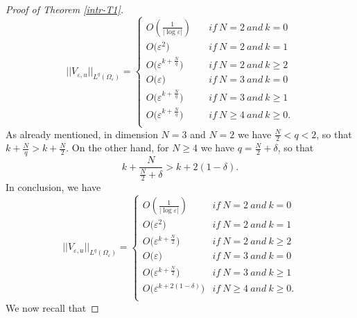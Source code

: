 \documentclass[11pt,reqno]{article}
\numberwithin{equation}{section}
\newcommand\e\varepsilon
\newcommand\la\lambda
\begin{document}
\begin{proof}[Proof of Theorem \ref{intr-T1}]
\begin{equation}
        ||V_{\e,u}||_{L^q(\Omega_\e)}=
            \begin{cases}
                O\left(\frac{1}{|\log\e|}\right)\quad& if  \ N=2  \ and\ k=0\\
                O\big(\e^2\big) & if  \ N=2  \ and\ k=1\\
                O\big(\e^{k+\frac{N}{q}}\big) & if  \ N=2  \ and\ k\ge 2\\
                O\big(\e\big) & if  \ N=3  \ and\ k=0\\
                O\big(\e^{k+\frac{N}{q}}\big) & if  \ N=3  \ and\ k\ge 1\\
                 O\big(\e^{k+\frac{N}{q}}\big) & if  \ N\ge 4  \ and\ k\ge 0.\\
            \end{cases}
        \end{equation}
        As already mentioned, in dimension $N=3$ and $N=2$ we have $\frac{N}{2}<q<2$, so that $k+\frac{N}{q}>k+\frac{N}{2}$. On the other hand, for $N\ge 4$ we have $q=\frac{N}{2}+\delta$, so that 
		\[
		k+\frac{N}{\frac N2+\delta} >k+ 2(1-\delta).
		\]
		In conclusion, we have \begin{equation}
        ||V_{\e,u}||_{L^q(\Omega_\e)}=
            \begin{cases}
                O\left(\frac{1}{|\log\e|}\right)\quad& if  \ N=2  \ and\ k=0\\
                O\big(\e^2\big) & if  \ N=2  \ and\ k=1\\
                O\big(\e^{k+\frac{N}{2}}\big) & if  \ N=2  \ and\ k\ge 2\\
                O\big(\e\big) & if  \ N=3  \ and\ k=0\\
                O\big(\e^{k+\frac{N}{2}}\big) & if  \ N=3  \ and\ k\ge 1\\
                 O\big(\e^{k+ 2(1-\delta)}\big) & if  \ N\ge 4  \ and\ k\ge 0.\\
            \end{cases}
        \end{equation}
		We now recall that
\end{proof}
\end{document}
